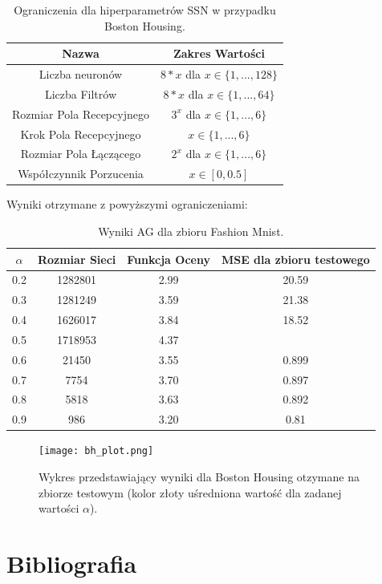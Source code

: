\documentclass{article}
\begin{document}
\begin{table}[H]
\centering
\begin{tabular}{|c|c|}
	\hline
	Nazwa & Zakres Wartości  \\
	\hline
	Liczba neuronów           & $8*x$ dla $x\in \{1, ...,128\}$\\
	Liczba Filtrów            & $8*x$ dla $x\in \{1, ...,64\}$\\
	Rozmiar Pola Recepcyjnego & $3^x$ dla $x \in \{1, ...,6\}$\\
	Krok Pola Recepcyjnego    & $x \in \{1, ...,6\}$\\
	Rozmiar Pola Łączącego    & $2^x$ dla $x \in \{1, ...,6\}$\\
	Współczynnik Porzucenia   & $x \in [0, 0.5]$\\
	\hline
\end{tabular}
\caption{\label{tab:bh_zakres}Ograniczenia dla hiperparametrów SSN w przypadku Boston
Housing.}
\end{table}
Wyniki otrzymane z powyższymi ograniczeniami:\\
\begin{table}[H]
\centering
\begin{tabular}{|c|c|c|c|}
        \hline
	$\alpha$ & Rozmiar Sieci & Funkcja Oceny & MSE dla zbioru testowego\\
	\hline
	0.2 & 1282801 & 2.99 &  20.59 \\
	0.3 & 1281249 & 3.59 & 21.38 \\
	0.4 & 1626017 & 3.84 & 18.52\\
	0.5 & 1718953 & 4.37 &  \\
	0.6 & 21450 & 3.55 & 0.899 \\
	0.7 & 7754 & 3.70 & 0.897 \\
	0.8 & 5818 &  3.63 & 0.892 \\
	0.9 & 986 & 3.20 & 0.81 \\
	\hline
\end{tabular}
\caption{\label{tab:fmres}Wyniki AG dla zbioru Fashion Mnist.}
\end{table}

\begin{figure}[H]
\centering
\texttt{[image: bh\_plot.png]}
\caption{Wykres przedstawiający wyniki dla Boston Housing otzymane na zbiorze testowym
(kolor złoty uśredniona wartość dla zadanej wartości $\alpha$).}
\end{figure}




\section{Bibliografia}
\printbibliography
\end{document}
